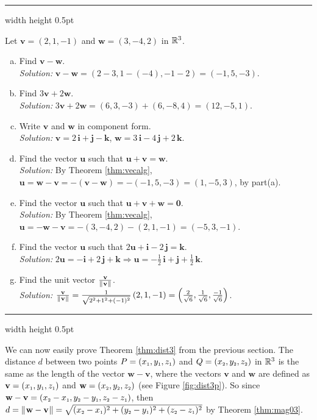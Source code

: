 \hrule width \textwidth height 0.5pt
\begin{exmp}
 Let $\mathbf{v} = (2,1,-1)$ and $\mathbf{w} = (3,-4,2)$ in $\mathbb{R}^{3}$.
 \begin{enumerate}[(a)]
  \item Find $\mathbf{v} - \mathbf{w}$.\\\emph{Solution:} $\mathbf{v} - \mathbf{w} =
   (2 - 3,1 - (-4), -1 - 2) = (-1,5,-3)$.
  \item Find $3\mathbf{v} + 2\mathbf{w}$.\\\emph{Solution:} $3\mathbf{v} + 2\mathbf{w} = (6,3,-3) + (6,-8,4) =
   (12,-5,1)$.
  \item Write $\mathbf{v}$ and $\mathbf{w}$ in component form.\\\emph{Solution:}
   $\mathbf{v} = 2\,\mathbf{i} + \mathbf{j} - \mathbf{k}$, $\mathbf{w} = 3\,\mathbf{i} - 4\,\mathbf{j} + 2\,\mathbf{k}$.
  \item Find the vector $\mathbf{u}$ such that $\mathbf{u} + \mathbf{v} = \mathbf{w}$.\\\emph{Solution:} By Theorem
   \ref{thm:vecalg}, $\mathbf{u} = \mathbf{w} - \mathbf{v} = -(\mathbf{v} - \mathbf{w}) = -(-1,5,-3) = (1,-5,3)$, by
   part(a).
  \item Find the vector $\mathbf{u}$ such that $\mathbf{u} + \mathbf{v} + \mathbf{w} = \mathbf{0}$.\\\emph{Solution:}
   By Theorem \ref{thm:vecalg}, $\mathbf{u} = -\mathbf{w} - \mathbf{v} = -(3,-4,2) - (2,1,-1) = (-5,3,-1)$.
  \item Find the vector $\mathbf{u}$ such that $2\mathbf{u} + \mathbf{i} - 2\,\mathbf{j} = \mathbf{k}$.\\\emph{Solution:}
   $2\mathbf{u} = -\mathbf{i} + 2\,\mathbf{j} + \mathbf{k} \Longrightarrow \mathbf{u} = -\frac{1}{2}\,\mathbf{i} +
  \mathbf{j} + \frac{1}{2}\,\mathbf{k}$.
  \item Find the unit vector $\frac{\mathbf{v}}{\lVert\mspace{1mu}\mathbf{v}\mspace{1mu}\rVert}$.\\\emph{Solution:}
   $\frac{\mathbf{v}}{\lVert\mspace{1mu}\mathbf{v}\mspace{1mu}\rVert} = \frac{1}{\sqrt{2^2 + 1^2 + (-1)^2}} \,(2,1,-1) =
   \left ( \frac{2}{\sqrt{6}},\frac{1}{\sqrt{6}},\frac{-1}{\sqrt{6}} \right )$.
 \end{enumerate} 
\end{exmp}
\hrule width \textwidth height 0.5pt

We can now easily prove Theorem \ref{thm:dist3} from the previous section. The distance $d$ between two
points $P = (x_{\scriptscriptstyle 1},y_{\scriptscriptstyle 1},z_{\scriptscriptstyle 1})$ and $Q = (x_{\scriptscriptstyle 2},y_{\scriptscriptstyle 2},z_{\scriptscriptstyle 2})$ in $\mathbb{R}^{3}$ is the
same as the length of the vector $\mathbf{w} - \mathbf{v}$, where the vectors $\mathbf{v}$ and $\mathbf{w}$ are
defined as $\mathbf{v} = (x_{\scriptscriptstyle 1},y_{\scriptscriptstyle 1},z_{\scriptscriptstyle 1})$
and $\mathbf{w} = (x_{\scriptscriptstyle 2},y_{\scriptscriptstyle 2},z_{\scriptscriptstyle 2})$ (see Figure \ref{fig:dist3p}). 
So since 
$\mathbf{w} - \mathbf{v} = (x_{\scriptscriptstyle 2} - x_{\scriptscriptstyle 1},y_{\scriptscriptstyle 2} - y_{\scriptscriptstyle 1},z_{\scriptscriptstyle 2} - z_{\scriptscriptstyle 1})$, then
$d = \lVert\mspace{1mu}\mathbf{w} - \mathbf{v}\mspace{1mu}\rVert = \sqrt{(x_{\scriptscriptstyle 2} - x_{\scriptscriptstyle 1})^2 + (y_{\scriptscriptstyle 2} - y_{\scriptscriptstyle 1})^2 +
(z_{\scriptscriptstyle 2} - z_{\scriptscriptstyle 1})^2}$ by Theorem \ref{thm:mag03}.

